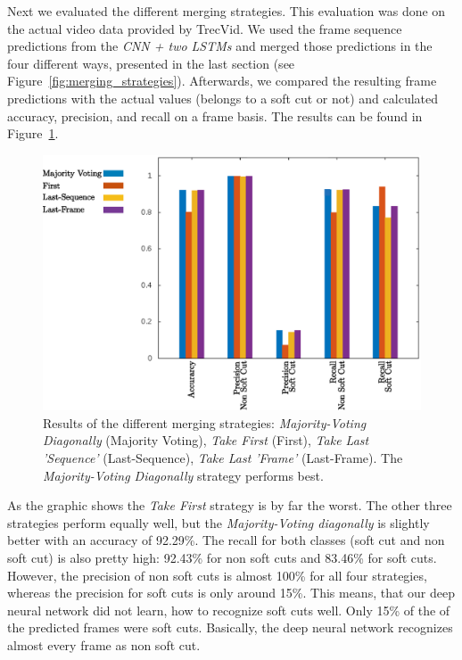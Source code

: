 Next we evaluated the different merging strategies.
This evaluation was done on the actual video data provided by TrecVid.
We used the frame sequence predictions from the \textit{CNN + two LSTMs} and merged those predictions in the four different ways, presented in the last section (see Figure~\ref{fig:merging_strategies}).
Afterwards, we compared the resulting frame predictions with the actual values (belongs to a soft cut or not) and calculated accuracy, precision, and recall on a frame basis.
The results can be found in Figure~\ref{fig:evaluation_net}.
\begin{figure}[!htb]
	\centering
	\includegraphics[scale=.7]{images/evalutation_net.eps}
	\caption{Results of the different merging strategies: \textit{Majority-Voting Diagonally} (Majority Voting), \textit{Take First} (First), \textit{Take Last 'Sequence'} (Last-Sequence), \textit{Take Last 'Frame'} (Last-Frame). The \textit{Majority-Voting Diagonally} strategy performs best.}
	\label{fig:evaluation_net}
\end{figure}
As the graphic shows the \textit{Take First} strategy is by far the worst.
The other three strategies perform equally well, but the \textit{Majority-Voting diagonally} is slightly better with an accuracy of 92.29\%.
The recall for both classes (soft cut and non soft cut) is also pretty high: 92.43\% for non soft cuts and 83.46\% for soft cuts.
However, the precision of non soft cuts is almost 100\% for all four strategies, whereas the precision for soft cuts is only around 15\%.
This means, that our deep neural network did not learn, how to recognize soft cuts well.
Only 15\% of the of the predicted frames were soft cuts.
Basically, the deep neural network recognizes almost every frame as non soft cut.


